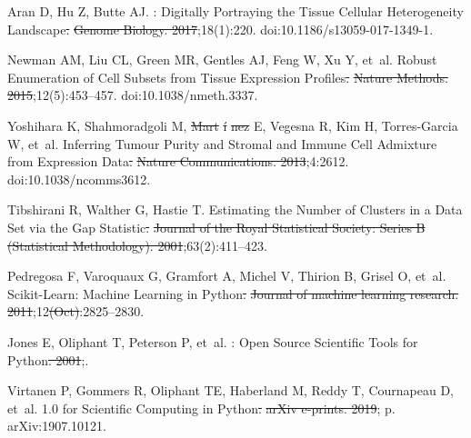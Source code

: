 \documentclass[10pt,letterpaper]{article}
\providecommand{\DIFaddtex}[1]{{\protect\color{blue}\uwave{#1}}} %
\providecommand{\DIFdeltex}[1]{{\protect\color{red}\sout{#1}}}                      %
\providecommand{\DIFaddbegin}{} %
\providecommand{\DIFaddend}{} %
\providecommand{\DIFdelbegin}{} %
\providecommand{\DIFdelend}{} %
\providecommand{\DIFadd}[1]{\texorpdfstring{\DIFaddtex{#1}}{#1}} %
\providecommand{\DIFdel}[1]{\texorpdfstring{\DIFdeltex{#1}}{}} %
\newcommand{\DIFscaledelfig}{0.5}
\newlength{\DIFdelgraphicswidth} %
\newlength{\DIFdelgraphicsheight} %
\newcommand{\DIFaddincludegraphics}[2][]{{\color{blue}\fbox{\DIFOincludegraphics[#1]{#2}}}} %
\newcommand{\DIFdelincludegraphics}[2][]{%
\sbox{\DIFdelgraphicsbox}{\DIFOincludegraphics[#1]{#2}}%
\settoboxwidth{\DIFdelgraphicswidth}{\DIFdelgraphicsbox} %
\settoboxtotalheight{\DIFdelgraphicsheight}{\DIFdelgraphicsbox} %
\scalebox{\DIFscaledelfig}{%
\parbox[b]{\DIFdelgraphicswidth}{\usebox{\DIFdelgraphicsbox}\\[-\baselineskip] \rule{\DIFdelgraphicswidth}{0em}}\llap{\resizebox{\DIFdelgraphicswidth}{\DIFdelgraphicsheight}{%
\setlength{\unitlength}{\DIFdelgraphicswidth}%
\begin{picture}(1,1)%
\thicklines\linethickness{2pt} %
{\color[rgb]{1,0,0}\put(0,0){\framebox(1,1){}}}%
{\color[rgb]{1,0,0}\put(0,0){\line( 1,1){1}}}%
{\color[rgb]{1,0,0}\put(0,1){\line(1,-1){1}}}%
\end{picture}%
}\hspace*{3pt}}} %
} %
\DeclareRobustCommand{\DIFaddbegin}{\DIFOaddbegin \let\includegraphics\DIFaddincludegraphics} %
\DeclareRobustCommand{\DIFaddend}{\DIFOaddend \let\includegraphics\DIFOincludegraphics} %
\DeclareRobustCommand{\DIFdelbegin}{\DIFOdelbegin \let\includegraphics\DIFdelincludegraphics} %
\DeclareRobustCommand{\DIFdelend}{\DIFOaddend \let\includegraphics\DIFOincludegraphics} %
\begin{document}
\begin{thebibliography}{10}
	\DIFaddend {}
	Aran D, Hu Z, Butte AJ.
	: Digitally Portraying the Tissue Cellular Heterogeneity
	Landscape\DIFdelbegin \DIFdel{.
	}%
\DIFdel{Genome Biology. 2017}\DIFdelend ;18(1):220.
	\newblock doi:{10.1186/s13059-017-1349-1}.

	Newman AM, Liu CL, Green MR, Gentles AJ, Feng W, Xu Y, et~al.
	\newblock Robust Enumeration of Cell Subsets from Tissue Expression
	Profiles\DIFdelbegin \DIFdel{.
	}%
\DIFdel{Nature Methods. 2015}\DIFdelend ;12(5):453--457.
	\newblock doi:{10.1038/nmeth.3337}.

	Yoshihara K, Shahmoradgoli M, \DIFdelbegin \DIFdel{Mart}%
\DIFdel{\'i}%
\DIFdel{nez }\DIFdelend \DIFaddbegin \DIFadd{Martínez }\DIFaddend E, Vegesna R, Kim H, \DIFdelbegin %
\DIFdelend Torres-Garcia \DIFdelbegin %
\DIFdelend W,
	et~al.
	\newblock Inferring Tumour Purity and Stromal and Immune Cell Admixture from
	Expression Data\DIFdelbegin \DIFdel{.
	}%
\DIFdel{Nature Communications. 2013}\DIFdelend ;4:2612.
	\newblock doi:{10.1038/ncomms3612}.

	Tibshirani R, Walther G, Hastie T.
	\newblock Estimating the Number of Clusters in a Data Set via the Gap
	Statistic\DIFdelbegin \DIFdel{.
	}%
\DIFdel{Journal of the Royal Statistical Society: Series B (Statistical
	Methodology). 2001}\DIFdelend ;63(2):411--423.

	Pedregosa F, Varoquaux G, Gramfort A, Michel V, Thirion B, Grisel O, et~al.
	\newblock Scikit-Learn: Machine Learning in Python\DIFdelbegin \DIFdel{.
	}%
\DIFdel{Journal of machine learning research. 2011}\DIFdelend ;12\DIFdelbegin \DIFdel{(Oct)}\DIFdelend :2825--2830.

	Jones E, Oliphant T, Peterson P, et~al.
	: {{Open}} Source Scientific Tools for {{Python}}\DIFdelbegin \DIFdel{. 2001}\DIFdelend ;.

	Virtanen P, Gommers R, Oliphant TE, Haberland M, Reddy T, Cournapeau D, et~al.
	 1.0\DIFdelbegin \DIFdel{ }\DIFdelend \DIFaddbegin \DIFadd{–}{{\DIFadd{Fundamental Algorithms}}} \DIFaddend for {{Scientific
			Computing}} in {{Python}}\DIFdelbegin \DIFdel{.
	}%
\DIFdel{arXiv e-prints. 2019}\DIFdelend ; p. arXiv:1907.10121.


\end{thebibliography}
\end{document}

